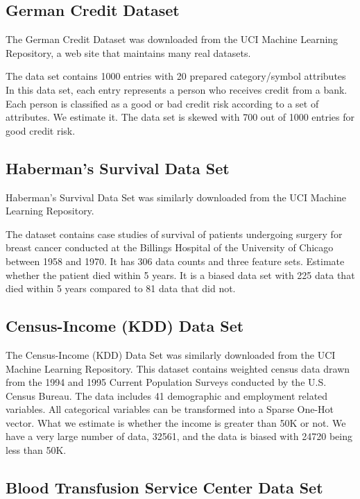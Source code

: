 \subsection{German Credit Dataset}

The German Credit Dataset was downloaded from the UCI Machine Learning Repository, a web site that maintains many real datasets\cite{German}. 

The data set contains 1000 entries with 20 prepared category/symbol attributes
In this data set, each entry represents a person who receives credit from a bank. Each person is classified as a good or bad credit risk according to a set of attributes. We estimate it.
The data set is skewed with 700 out of 1000 entries for good credit risk.


\subsection{Haberman's Survival Data Set}

Haberman's Survival Data Set was similarly downloaded from the UCI Machine Learning Repository\cite{Haberman}.

The dataset contains case studies of survival of patients undergoing surgery for breast cancer conducted at the Billings Hospital of the University of Chicago between 1958 and 1970.
It has 306 data counts and three feature sets.
Estimate whether the patient died within 5 years.
It is a biased data set with 225 data that died within 5 years compared to 81 data that did not.

\subsection{Census-Income (KDD) Data Set}

The Census-Income (KDD) Data Set was similarly downloaded from the UCI Machine Learning Repository\cite{Census}.
This dataset contains weighted census data drawn from the 1994 and 1995 Current Population Surveys conducted by the U.S. Census Bureau. The data includes 41 demographic and employment related variables.
All categorical variables can be transformed into a Sparse One-Hot vector.
What we estimate is whether the income is greater than 50K or not.
We have a very large number of data, 32561, and the data is biased with 24720 being less than 50K.

\subsection{Blood Transfusion Service Center Data Set}

